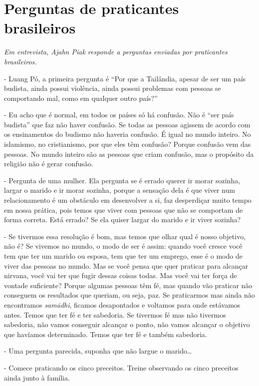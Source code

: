 
\chapter{Perguntas de praticantes brasileiros}

{\itshape
Em entrevista, Ajahn Piak responde a perguntas enviadas por praticantes
brasileiros.}

- Luang Pó, a primeira pergunta é “Por que a Tailândia, apesar de
ser um país budista, ainda possui violência, ainda possui problemas com
pessoas se comportando mal, como em qualquer outro país?”

- Eu acho que é normal, em todos os países só há confusão. Não é
“ser país budista” que faz não haver confusão. Se todas as pessoas
agissem de acordo com os ensinamentos do budismo não haveria confusão.
É igual no mundo inteiro. No islamismo, no cristianismo, por que eles
têm confusão? Porque confusão vem das pessoas. No mundo inteiro são as
pessoas que criam confusão, mas o propósito da religião não é gerar
confusão. 

- Pergunta de uma mulher. Ela pergunta se é errado querer ir morar
sozinha, largar o marido e ir morar sozinha, porque a sensação dela é
que viver num relacionamento é um obstáculo em desenvolver a si, faz
desperdiçar muito tempo em nossa prática, pois temos que viver com
pessoas que não se comportam de forma correta. Está errado? Se ela
quiser largar do marido e ir viver sozinha?

- Se tivermos essa resolução é bom, mas temos que olhar qual é
nosso objetivo, não é? Se vivemos no mundo, o modo de ser é assim:
quando você cresce você tem que ter um marido ou esposa, tem que ter um
emprego, esse é o modo de viver das pessoas no mundo. Mas se você pensa
que quer praticar para alcançar nirvana, você vai ter que fugir dessas
coisas todas. Mas você vai ter força de vontade suficiente? Porque
algumas pessoas têm fé, mas quando vão praticar não conseguem os
resultados que queriam, ou seja, paz. Se praticarmos mas ainda não
encontramos \textit{sam\=adhi}, ficamos desapontados e voltamos para
onde estávamos antes. Temos que ter fé e ter sabedoria. Se tivermos fé
mas não tivermos sabedoria, não vamos conseguir alcançar o ponto, não
vamos alcançar o objetivo que havíamos determinado. Temos que ter fé e
também sabedoria.

- Uma pergunta parecida, suponha que não largue o marido…

- Comece praticando os cinco preceitos. Treine observando os cinco
preceitos ainda junto à família.

